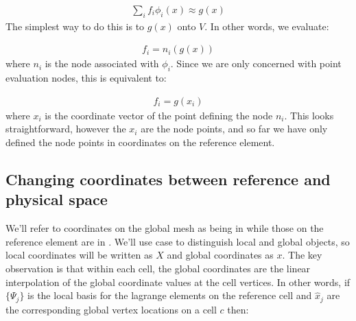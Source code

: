 \documentclass{book}
\begin{document}
\label{\detokenize{5_functions:equation-5_functions:0}}\begin{equation}\label{equation:5_functions:5_functions:0}
\begin{split}\sum_i f_i \phi_i(x) \approx g(x)\end{split}
\end{equation}
The simplest way to do this is to  \(g(x)\) onto \(V\). In
other words, we evaluate:

\label{\detokenize{5_functions:equation-5_functions:1}}\begin{equation}\label{equation:5_functions:5_functions:1}
\begin{split}f_i = n_i(g(x))\end{split}
\end{equation}
where \(n_i\) is the node associated with \(\phi_i\). Since we are only
concerned with point evaluation nodes, this is equivalent to:

\label{\detokenize{5_functions:equation-5_functions:2}}\begin{equation}\label{equation:5_functions:5_functions:2}
\begin{split}f_i = g(x_i)\end{split}
\end{equation}
where \(x_i\) is the coordinate vector of the point defining the node
\(n_i\). This looks straightforward, however the \(x_i\) are the 
node points, and so far we have only defined the node points in
 coordinates on the reference element.


\subsection{Changing coordinates between reference and physical space}
\label{\detokenize{5_functions:coordinates}}\label{\detokenize{5_functions:changing-coordinates-between-reference-and-physical-space}}
We’ll refer to coordinates on the global mesh as being in  while those on the reference element are in . We’ll use case to distinguish local and global objects, so
local coordinates will be written as \(X\) and global coordinates as
\(x\). The key observation is that within each cell, the global
coordinates are the linear interpolation of the global coordinate
values at the cell vertices. In other words, if \(\{\Psi_j\}\) is the
local basis for the  lagrange elements on the reference cell and
\(\hat{x}_j\) are the corresponding global vertex locations on a cell \(c\)
then:
\end{document}
